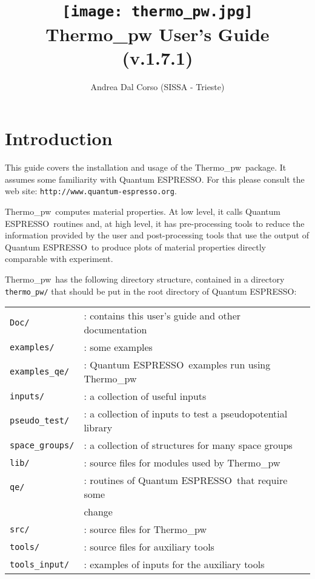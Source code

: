 \documentclass[12pt,a4paper,twoside]{report}
\def\version{1.7.1}
\def\qe{{\sc Quantum ESPRESSO}}
\def\thermo{{\sc Thermo}\_{\sc pw}}
\begin{document}
 

\author{Andrea Dal Corso (SISSA - Trieste)}
\date{}

\title{
  \texttt{[image: thermo\_pw.jpg]} \\
  \vspace{3truecm}
  \Huge \color{dark-blue} {\sc Thermo}\_{\sc pw} User's Guide \\
  (v.\version)
}

\maketitle

\newpage

\tableofcontents

\newpage

{\color{dark-blue}\chapter{Introduction}}
\color{black}
This guide covers the installation and usage of the \thermo\ package. 
It assumes some familiarity with \qe. 
For this please consult the web site: \texttt{http://www.quantum-espresso.org}.

\thermo\ computes material properties.
At low level, it calls \qe\ routines and, at high level, it has pre-processing
tools to reduce the information provided by the user and
post-processing tools that use the output of \qe\ to produce plots of material 
properties directly comparable with experiment. 

\thermo\ has the following directory structure, contained in a directory 
\texttt{thermo\_pw/} that should be put in the root directory of \qe:

\begin{tabular}{ll}
\texttt{Doc/}      & : contains this user's guide and other documentation\\
\texttt{examples/} & : some examples \\
\texttt{examples\_qe/} & : \qe\ examples run using 
\thermo \\
\texttt{inputs/}   & : a collection of useful inputs \\
\texttt{pseudo\_test/} & : a collection of inputs to test a pseudopotential library\\
\texttt{space\_groups/} & : a collection of structures for many space groups \\
\texttt{lib/}      & : source files for modules used by \thermo\ \\
\texttt{qe/}       & : routines of \qe\ that require some \\
                   &   change \\
\texttt{src/}      & : source files for \thermo\ \\
\texttt{tools/}    & : source files for auxiliary tools \\
\texttt{tools\_input/}  & : examples of inputs for the auxiliary tools \\
\end{tabular}\\
\end{document}
